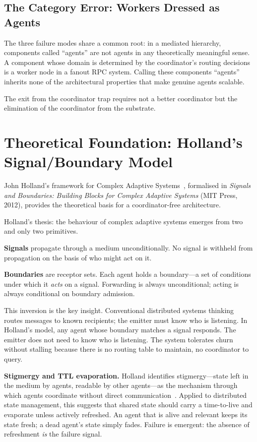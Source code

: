 \documentclass[11pt]{article}
\begin{document}
\subsection{The Category Error: Workers Dressed as Agents}

The three failure modes share a common root: in a mediated hierarchy, components
called ``agents'' are not agents in any theoretically meaningful sense. A component
whose domain is determined by the coordinator's routing decisions is a worker node
in a fanout RPC system. Calling these components ``agents'' inherits none of the
architectural properties that make genuine agents scalable.

The exit from the coordinator trap requires not a better coordinator but the
elimination of the coordinator from the substrate.

\section{Theoretical Foundation: Holland's Signal/Boundary Model}

John Holland's framework for Complex Adaptive Systems~\cite{holland,holland-intro},
formalised in \emph{Signals and Boundaries: Building Blocks for Complex Adaptive
Systems} (MIT Press, 2012), provides the theoretical basis for a coordinator-free
architecture.

Holland's thesis: the behaviour of complex adaptive systems emerges from two and
only two primitives.

\textbf{Signals} propagate through a medium unconditionally. No signal is withheld
from propagation on the basis of who might act on it.

\textbf{Boundaries} are receptor sets. Each agent holds a boundary---a set of
conditions under which it \emph{acts} on a signal. Forwarding is always
unconditional; acting is always conditional on boundary admission.

This inversion is the key insight. Conventional distributed systems thinking
routes messages to known recipients; the emitter must know who is listening. In
Holland's model, any agent whose boundary matches a signal responds. The emitter
does not need to know who is listening. The system tolerates churn without stalling
because there is no routing table to maintain, no coordinator to query.

\textbf{Stigmergy and TTL evaporation.} Holland identifies stigmergy---state left
in the medium by agents, readable by other agents---as the mechanism through which
agents coordinate without direct communication~\cite{dorigo}. Applied to
distributed state management, this suggests that shared state should carry a
time-to-live and evaporate unless actively refreshed. An agent that is alive and
relevant keeps its state fresh; a dead agent's state simply fades. Failure is
emergent: the absence of refreshment \emph{is} the failure signal.
\end{document}
